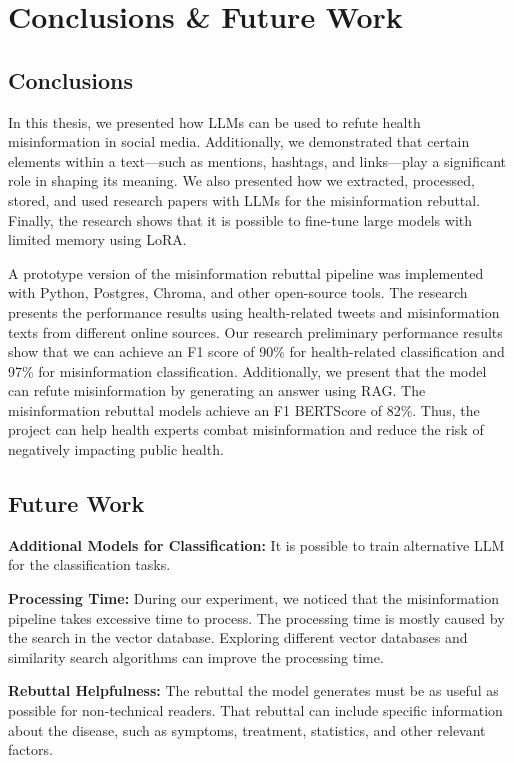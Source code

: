 



\chapter{Conclusions \& Future Work}  

\section{Conclusions}
\noindent In this thesis, we presented how LLMs can be used to refute health misinformation in social media. Additionally, we demonstrated that certain elements within a text—such as mentions, hashtags, and links—play a significant role in shaping its meaning. We also presented how we extracted, processed, stored, and used research papers with LLMs for the misinformation rebuttal. Finally, the research shows that it is possible to fine-tune large models with limited memory using LoRA.

A prototype version of the misinformation rebuttal pipeline was implemented with Python, Postgres, Chroma, and other open-source tools. The research presents the performance results using health-related tweets and misinformation texts from different online sources. Our research preliminary performance results show that we can achieve an F1 score of 90\% for health-related classification and 97\% for misinformation classification. Additionally, we present that the model can refute misinformation by generating an answer using RAG. The misinformation rebuttal models achieve an F1 BERTScore of 82\%. Thus, the project can help health experts combat misinformation and reduce the risk of negatively impacting public health.

\section{Future Work}

\begin{description}

\item{\textbf{Additional Models for Classification:}} It is possible to train alternative LLM  for the classification tasks.

\item{\textbf{Processing Time:}} During our experiment, we noticed that the misinformation pipeline takes excessive time to process. The processing time is mostly caused by the search in the vector database. Exploring different vector databases and similarity search algorithms can improve the processing time.

\item{\textbf{Rebuttal Helpfulness:}} The rebuttal the model generates must be as useful as possible for non-technical readers. That rebuttal can include specific information about the disease, such as symptoms, treatment, statistics, and other relevant factors.

\end{description}